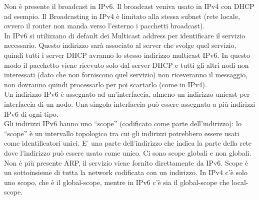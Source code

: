 \documentclass{article}
\begin{document}
Non è presente il broadcast in IPv6. Il broadcast veniva usato in IPv4 con DHCP ad esempio. Il Broadcasting in IPv4 è limitato alla stessa subnet (rete locale, ovvero il router non manda verso l’esterno i pacchetti broadcast). \\ In IPv6 si utilizzano di default dei Multicast address per identificare il servizio necessario. Questo indirizzo sarà associato al server che svolge quel servizio, quindi tutti i server DHCP avranno lo stesso indirizzo multicast IPv6. In questo modo il pacchetto viene ricevuto solo dal server DHCP e tutti gli altri nodi non interessati (dato che non forniscono quel servizio) non riceveranno il messaggio, non dovranno quindi processarlo per poi scartarlo (come in IPv4).\\ Un indirizzo IPv6 è assegnato ad un’interfaccia, almeno un indirizzo unicast per interfaccia di un nodo. Una singola interfaccia può essere assegnata a più indirizzi IPv6 di ogni tipo. \\ Gli indirizzi IPv6 hanno uno “scope” (codificato come parte dell’indirizzo): lo “scope” è un intervallo topologico tra cui gli indirizzi potrebbero essere usati come identificatori unici. E’ una parte dell’indirizzo che indica la parte della rete dove l’indirizzo può essere usato come unico. Ci sono scope globali e non globali.\\ Non è più presente ARP, il servizio viene fornito direttamente da IPv6. Scope è un sottoinsieme di tutta la network codificata con un indirizzo. In IPv4 c’è solo uno scopo, che è il global-scope, mentre in IPv6 c’è sia il global-scope che local-scope.
\end{document}
